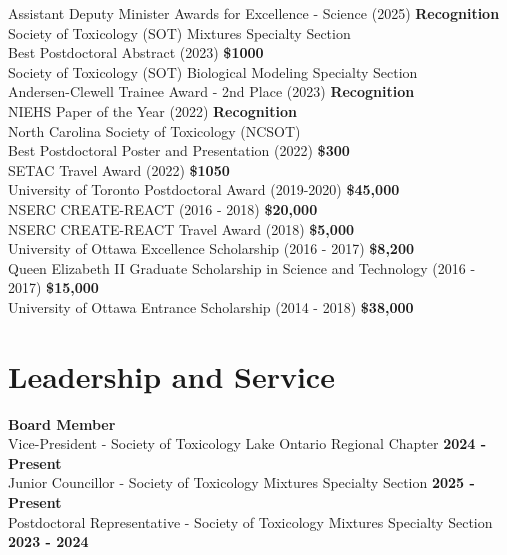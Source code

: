 \documentclass[margin,line]{res}
\newcommand\tab[1][1cm]{\hspace*{#1}}
\begin{document}
\begin{resume}
Assistant Deputy Minister Awards for Excellence - Science (2025)
\hfill {\textbf{Recognition}}\\
Society of Toxicology (SOT) Mixtures Specialty Section\\
\tab Best Postdoctoral Abstract (2023)
\hfill {\textbf{\$1000}}\\
Society of Toxicology (SOT) Biological Modeling Specialty Section\\
\tab Andersen-Clewell Trainee Award - 2nd Place (2023)
\hfill {\textbf{Recognition}}\\
NIEHS Paper of the Year (2022)
\hfill {\textbf{Recognition}}\\
North Carolina Society of Toxicology (NCSOT)\\
\tab Best Postdoctoral Poster and Presentation (2022)
\hfill {\textbf{\$300}}\\
SETAC Travel Award (2022)
\hfill {\textbf{\$1050}}\\
University of Toronto Postdoctoral Award (2019-2020)
\hfill {\textbf{\$45,000}}\\
NSERC CREATE-REACT (2016 - 2018)
\hfill {\textbf{\$20,000}}\\
NSERC CREATE-REACT Travel Award (2018)
\hfill {\textbf{\$5,000}}\\
University of Ottawa Excellence Scholarship (2016 - 2017)
\hfill {\textbf{\$8,200}}\\
Queen Elizabeth II Graduate Scholarship in Science and Technology (2016 - 2017)
\hfill {\textbf{\$15,000}}\\
University of Ottawa Entrance Scholarship (2014 - 2018)
\hfill {\textbf{\$38,000}}\\

\vspace*{.1in}

\section{\sc Leadership and Service}
{\bf Board Member}\\
{Vice-President - Society of Toxicology Lake Ontario Regional Chapter} \hfill {\bf 2024 - Present}\\
{Junior Councillor - Society of Toxicology Mixtures Specialty Section} \hfill {\bf 2025 - Present}\\
{Postdoctoral Representative - Society of Toxicology Mixtures Specialty Section} \hfill {\bf 2023 - 2024}\\



\end{resume}
\end{document}
